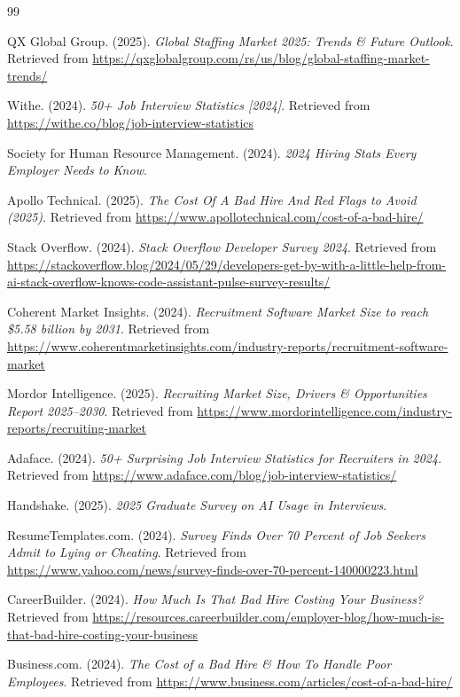 \documentclass[11pt,letterpaper]{article}
\begin{document}
\begin{thebibliography}{99}

QX Global Group. (2025). \textit{Global Staffing Market 2025: Trends \& Future Outlook}. Retrieved from \url{https://qxglobalgroup.com/rs/us/blog/global-staffing-market-trends/}

Withe. (2024). \textit{50+ Job Interview Statistics [2024]}. Retrieved from \url{https://withe.co/blog/job-interview-statistics}

Society for Human Resource Management. (2024). \textit{2024 Hiring Stats Every Employer Needs to Know}.

Apollo Technical. (2025). \textit{The Cost Of A Bad Hire And Red Flags to Avoid (2025)}. Retrieved from \url{https://www.apollotechnical.com/cost-of-a-bad-hire/}

Stack Overflow. (2024). \textit{Stack Overflow Developer Survey 2024}. Retrieved from \url{https://stackoverflow.blog/2024/05/29/developers-get-by-with-a-little-help-from-ai-stack-overflow-knows-code-assistant-pulse-survey-results/}

Coherent Market Insights. (2024). \textit{Recruitment Software Market Size to reach \$5.58 billion by 2031}. Retrieved from \url{https://www.coherentmarketinsights.com/industry-reports/recruitment-software-market}

Mordor Intelligence. (2025). \textit{Recruiting Market Size, Drivers \& Opportunities Report 2025–2030}. Retrieved from \url{https://www.mordorintelligence.com/industry-reports/recruiting-market}

Adaface. (2024). \textit{50+ Surprising Job Interview Statistics for Recruiters in 2024}. Retrieved from \url{https://www.adaface.com/blog/job-interview-statistics/}

Handshake. (2025). \textit{2025 Graduate Survey on AI Usage in Interviews}.

ResumeTemplates.com. (2024). \textit{Survey Finds Over 70 Percent of Job Seekers Admit to Lying or Cheating}. Retrieved from \url{https://www.yahoo.com/news/survey-finds-over-70-percent-140000223.html}

CareerBuilder. (2024). \textit{How Much Is That Bad Hire Costing Your Business?} Retrieved from \url{https://resources.careerbuilder.com/employer-blog/how-much-is-that-bad-hire-costing-your-business}

Business.com. (2024). \textit{The Cost of a Bad Hire \& How To Handle Poor Employees}. Retrieved from \url{https://www.business.com/articles/cost-of-a-bad-hire/}

\end{thebibliography}
\end{document}
